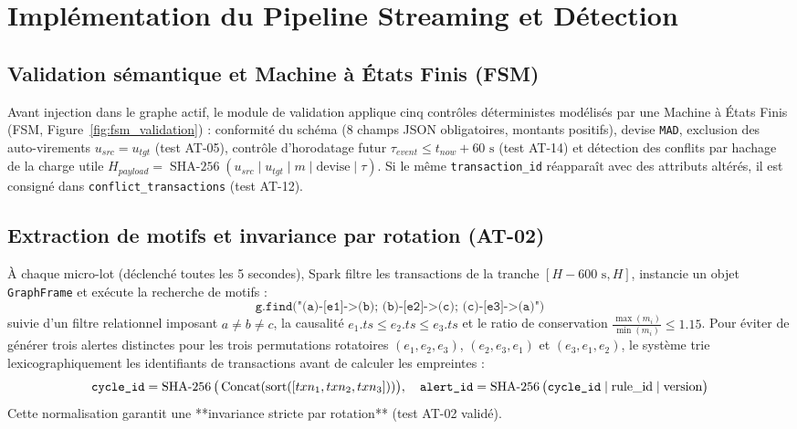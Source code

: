 
\chapter{Implémentation du Pipeline Streaming et Détection}
\label{ch:streaming}

\section{Validation sémantique et Machine à États Finis (FSM)}

Avant injection dans le graphe actif, le module de validation applique cinq contrôles déterministes modélisés par une Machine à États Finis (FSM, Figure~\ref{fig:fsm_validation}) : conformité du schéma (8 champs JSON obligatoires, montants positifs), devise \texttt{MAD}, exclusion des auto-virements $u_{src} = u_{tgt}$ (test AT-05), contrôle d'horodatage futur $\tau_{event} \le t_{now} + 60\text{ s}$ (test AT-14) et détection des conflits par hachage de la charge utile $H_{payload} = \operatorname{SHA-256}(u_{src} \mid u_{tgt} \mid m \mid \text{devise} \mid \tau)$. Si le même \texttt{transaction\_id} réapparaît avec des attributs altérés, il est consigné dans \texttt{conflict\_transactions} (test AT-12).


\section{Extraction de motifs et invariance par rotation (AT-02)}

À chaque micro-lot (déclenché toutes les 5 secondes), Spark filtre les transactions de la tranche $[H - 600\text{ s}, H]$, instancie un objet \texttt{GraphFrame} et exécute la recherche de motifs :
\begin{equation}
    \texttt{g.find("(a)-[e1]->(b); (b)-[e2]->(c); (c)-[e3]->(a)")}
\end{equation}
suivie d'un filtre relationnel imposant $a \ne b \ne c$, la causalité $e_1.ts \le e_2.ts \le e_3.ts$ et le ratio de conservation $\frac{\max(m_i)}{\min(m_i)} \le 1.15$. Pour éviter de générer trois alertes distinctes pour les trois permutations rotatoires $(e_1, e_2, e_3)$, $(e_2, e_3, e_1)$ et $(e_3, e_1, e_2)$, le système trie lexicographiquement les identifiants de transactions avant de calculer les empreintes :
\begin{equation}
    \texttt{cycle\_id} = \operatorname{SHA-256}\big(\operatorname{Concat}(\operatorname{sort}([txn_1, txn_2, txn_3]))\big), \quad \texttt{alert\_id} = \operatorname{SHA-256}\big(\texttt{cycle\_id} \mid \text{rule\_id} \mid \text{version}\big)
\end{equation}
Cette normalisation garantit une **invariance stricte par rotation** (test AT-02 validé).

